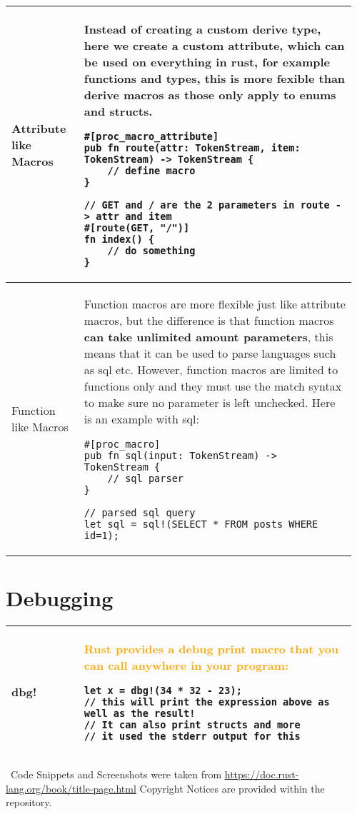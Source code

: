 \documentclass[main.tex,fontsize=8pt,paper=a4,paper=portrait,DIV=calc,]{scrartcl}
\begin{document}
\begin{table}[ht!]
\begin{tabular}{|m{0.2\linewidth}|m{0.755\linewidth}|}
\hline
Attribute like Macros & 
Instead of creating a custom derive type, here we create a custom attribute, which can be used on everything in rust, for example functions and types, this is more fexible than derive macros as those only apply to enums and structs.\newline
\begin{lstlisting}
#[proc_macro_attribute]
pub fn route(attr: TokenStream, item: TokenStream) -> TokenStream {
    // define macro
}

// GET and / are the 2 parameters in route -> attr and item
#[route(GET, "/")]
fn index() {
    // do something
}
\end{lstlisting}
\\
\hline
Function like Macros & 
Function macros are more flexible just like attribute macros, but the difference is that function macros \textbf{can take unlimited amount parameters}, this means that it can be used to parse languages such as sql etc.\newline
However, function macros are limited to functions only and they must use the match syntax to make sure no parameter is left unchecked.\newline
Here is an example with sql:\newline
\begin{lstlisting}
#[proc_macro]
pub fn sql(input: TokenStream) -> TokenStream {
    // sql parser
}

// parsed sql query
let sql = sql!(SELECT * FROM posts WHERE id=1);
\end{lstlisting}
\\
\hline
\end{tabular}
\section{Debugging}
\begin{tabular}{|m{0.2\linewidth}|m{0.755\linewidth}|}
\hline
dbg! &
\textcolor{orange}{Rust provides a debug print macro that you can call anywhere in your program:}\newline
\begin{lstlisting}
let x = dbg!(34 * 32 - 23); 
// this will print the expression above as well as the result!
// It can also print structs and more
// it used the stderr output for this
\end{lstlisting}\\
\hline
\end{tabular}
\, \newline
Code Snippets and Screenshots were taken from \href{https://doc.rust-lang.org/book/title-page.html}{https://doc.rust-lang.org/book/title-page.html}\newline
Copyright Notices are provided within the repository.
\end{table}
\end{document}
